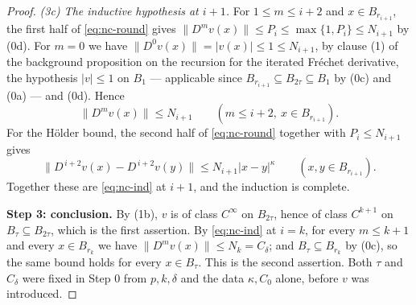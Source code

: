 \begin{proof}
\emph{(3c) The inductive hypothesis at $i+1$.}  For $1\le m\le i+2$ and $x\in B_{r_{i+1}}$, the
first half of \eqref{eq:nc-round} gives
$\lVert D^{m}v(x)\rVert\le P_i\le\max\{1,P_i\}\le N_{i+1}$ by (0d).  For $m=0$ we have
$\lVert D^{0}v(x)\rVert=\lvert v(x)\rvert\le1\le N_{i+1}$, by clause (1) of the background
proposition on the recursion for the iterated Fr\'echet derivative, the hypothesis
$\lvert v\rvert\le1$ on $B_1$ --- applicable since $B_{r_{i+1}}\subseteq B_{2\tau}\subseteq B_1$
by (0c) and (0a) --- and (0d).  Hence
\[
  \bigl\lVert D^{m}v(x)\bigr\rVert\le N_{i+1}\qquad(m\le i+2,\ x\in B_{r_{i+1}}).
\]
For the H\"older bound, the second half of \eqref{eq:nc-round} together with
$P_i\le N_{i+1}$ gives
\[
  \bigl\lVert D^{\,i+2}v(x)-D^{\,i+2}v(y)\bigr\rVert\le N_{i+1}\lvert x-y\rvert^{\kappa}
  \qquad(x,y\in B_{r_{i+1}}).
\]
Together these are \eqref{eq:nc-ind} at $i+1$, and the induction is complete.

\medskip\noindent\textbf{Step 3: conclusion.}
By (1b), $v$ is of class $C^{\infty}$ on $B_{2\tau}$, hence of class $C^{k+1}$ on
$B_\tau\subseteq B_{2\tau}$, which is the first assertion.  By \eqref{eq:nc-ind} at $i=k$, for
every $m\le k+1$ and every $x\in B_{r_k}$ we have $\lVert D^{m}v(x)\rVert\le N_k=C_\delta$; and
$B_\tau\subseteq B_{r_k}$ by (0c), so the same bound holds for every $x\in B_\tau$.  This is the
second assertion.  Both $\tau$ and $C_\delta$ were fixed in Step 0 from $p,k,\delta$ and the
data $\kappa,C_0$ alone, before $v$ was introduced.
\end{proof}
